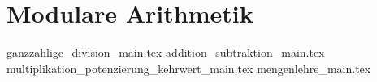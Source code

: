 
\part{Modulare Arithmetik}
\label{part-modulare-arithmetik}

{ganzzahlige_division_main.tex}
{addition_subtraktion_main.tex}
{multiplikation_potenzierung_kehrwert_main.tex}
{mengenlehre_main.tex}